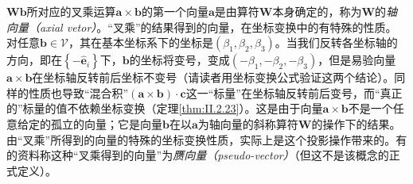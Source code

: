 \documentclass[../main.tex]{subfiles}
\begin{document}
$\mathbf{Wb}$所对应的叉乘运算$\mathbf{a}\times\mathbf{b}$的第一个向量$\mathbf{a}$是由算符$\mathbf{W}$本身确定的，称为$\mathbf{W}$的\emph{轴向量（axial vetor）}。“叉乘”的结果得到的向量，在坐标变换中的有特殊的性质。对任意$\mathbf{b}\in\mathcal{V}$，其在基本坐标系下的坐标是$\left(\beta_1,\beta_2,\beta_3\right)$。当我们反转各坐标轴的方向，即在$\left\{-\mathbf{\hat{e}}_i\right\}$下，$\mathbf{b}$的坐标将变号，变成$\left(-\beta_1,-\beta_2,-\beta_3\right)$，但是易验向量$\mathbf{a}\times\mathbf{b}$在坐标轴反转前后坐标不变号（请读者用坐标变换公式验证这两个结论）。同样的性质也导致“混合积”$\left(\mathbf{a}\times\mathbf{b}\right)\cdot\mathbf{c}$这一“标量”在坐标轴反转前后变号，而“真正的”标量的值不依赖坐标变换（定理\ref{thm:II.2.23}）。这是由于向量$\mathbf{a}\times\mathbf{b}$不是一个任意给定的孤立的向量；它是向量$\mathbf{b}$在以$\mathbf{a}$为轴向量的斜称算符$\mathbf{W}$的操作下的结果。由“叉乘”所得到的向量的特殊的坐标变换性质，实际上是这个投影操作带来的。有的资料称这种“叉乘得到的向量”为\emph{赝向量（pseudo-vector）}（但这不是该概念的正式定义）。
\end{document}
